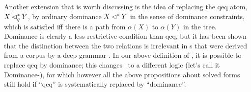Another extension that is worth discussing is the idea of replacing
the qeq atom, $X \lhd^*_q Y$, by ordinary dominance $X \lhd^* Y$ in the
sense of dominance constraints, which is satisfied iff there is a path
from $\alpha(X)$ to $\alpha(Y)$ in the tree.  Dominance is clearly a
less restrictive condition than qeq, but it has been shown that the
distinction between the two relations is irrelevant in \mrs s that were
derived from a corpus by a deep grammar \cite{FucKolNieTha04}.  In our
above definition of \rmrs, it is possible to replace qeq by dominance;
this changes \rmrs\ to a different logic (let's call it
Dominance-\rmrs), for which however all the above propositions about
solved forms still hold if ``qeq'' is systematically replaced by
``dominance''. 


